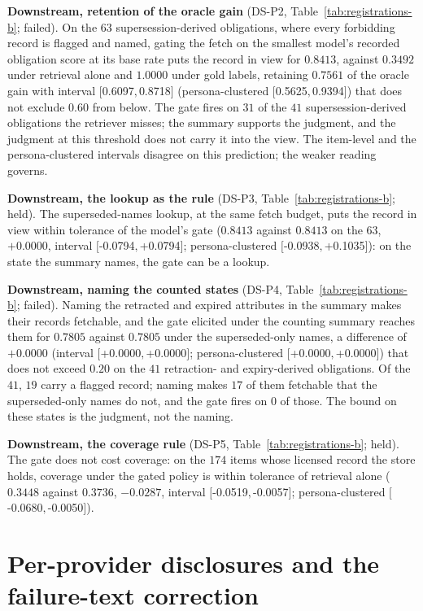 \documentclass{article}
\begin{document}
\noindent\textbf{Downstream, retention of the oracle gain} (DS-P2, Table~\ref{tab:registrations-b}; failed). On the $63$ supersession-derived obligations, where every forbidding record is flagged and named, gating the fetch on the smallest model's recorded obligation score at its base rate puts the record in view for $0.8413$, against $0.3492$ under retrieval alone and $1.0000$ under gold labels, retaining $0.7561$ of the oracle gain with interval $[$0.6097$,$0.8718$]$ (persona-clustered $[$0.5625$,$0.9394$]$) that does not exclude $0.60$ from below. The gate fires on $31$ of the $41$ supersession-derived obligations the retriever misses; the summary supports the judgment, and the judgment at this threshold does not carry it into the view. The item-level and the persona-clustered intervals disagree on this prediction; the weaker reading governs.

\noindent\textbf{Downstream, the lookup as the rule} (DS-P3, Table~\ref{tab:registrations-b}; held). The superseded-names lookup, at the same fetch budget, puts the record in view within tolerance of the model's gate ($0.8413$ against $0.8413$ on the $63$, $+0.0000$, interval $[$-0.0794$,$+0.0794$]$; persona-clustered $[$-0.0938$,$+0.1035$]$): on the state the summary names, the gate can be a lookup.

\noindent\textbf{Downstream, naming the counted states} (DS-P4, Table~\ref{tab:registrations-b}; failed). Naming the retracted and expired attributes in the summary makes their records fetchable, and the gate elicited under the counting summary reaches them for $0.7805$ against $0.7805$ under the superseded-only names, a difference of $+0.0000$ (interval $[$+0.0000$,$+0.0000$]$; persona-clustered $[$+0.0000$,$+0.0000$]$) that does not exceed $0.20$ on the $41$ retraction- and expiry-derived obligations. Of the $41$, $19$ carry a flagged record; naming makes $17$ of them fetchable that the superseded-only names do not, and the gate fires on $0$ of those. The bound on these states is the judgment, not the naming.

\noindent\textbf{Downstream, the coverage rule} (DS-P5, Table~\ref{tab:registrations-b}; held). The gate does not cost coverage: on the $174$ items whose licensed record the store holds, coverage under the gated policy is within tolerance of retrieval alone ($0.3448$ against $0.3736$, $-0.0287$, interval $[$-0.0519$,$-0.0057$]$; persona-clustered $[$-0.0680$,$-0.0050$]$).

\section{Per-provider disclosures and the failure-text correction}\label{sup:providers}
\end{document}
